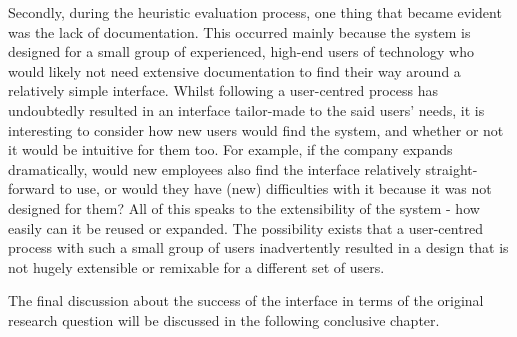 Secondly, during the heuristic evaluation process, one thing that became evident was the lack of documentation. This occurred mainly because the system is designed for a small group of experienced, high-end users of technology who would likely not need extensive documentation to find their way around a relatively simple interface.  Whilst following a user-centred process has undoubtedly resulted in an interface tailor-made to the said users' needs, it is interesting to consider how new users would find the system, and whether or not it would be intuitive for them too. For example, if the company expands dramatically, would new employees also find the interface relatively straight-forward to use, or would they have (new) difficulties with it because it was not designed for them? All of this speaks to the extensibility of the system - how easily can it be reused or expanded. The possibility exists that a user-centred process with such a small group of users inadvertently resulted in a design that is not hugely extensible or remixable for a different set of users.

The final discussion about the success of the interface in terms of the original research question will be discussed in the following conclusive chapter. 